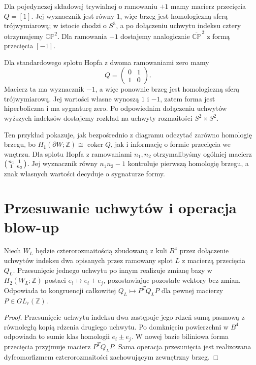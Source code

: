 \begin{przyklad}
Dla pojedynczej składowej trywialnej o ramowaniu $+1$
mamy macierz przecięcia $Q=[1]$. Jej wyznacznik jest równy $1$,
więc brzeg jest homologiczną sferą trójwymiarową; w istocie
chodzi o $S^3$, a po dołączeniu uchwytu indeksu cztery
otrzymujemy $\mathbb{CP}^2$.
Dla ramowania $-1$ dostajemy analogicznie
$\overline{\mathbb{CP}}^{\,2}$ z formą przecięcia $[-1]$.

Dla standardowego splotu Hopfa z dwoma ramowaniami zero mamy
\[
Q=\begin{pmatrix}0&1\\1&0\end{pmatrix}.
\]
Macierz ta ma wyznacznik $-1$, a więc ponownie brzeg jest
homologiczną sferą trójwymiarową. Jej wartości własne wynoszą
$1$ i $-1$, zatem forma jest hiperboliczna i ma sygnaturę zero.
Po odpowiednim dołączeniu uchwytów wyższych indeksów dostajemy
rozkład na uchwyty rozmaitości $S^2\times S^2$.

Ten przykład pokazuje, jak bezpośrednio z diagramu odczytać zarówno
homologię brzegu, bo $H_1(\partial W;\mathbb Z)\cong\operatorname{coker}Q$,
jak i informację o formie przecięcia we wnętrzu. Dla splotu Hopfa
z ramowaniami $n_1,n_2$ otrzymalibyśmy ogólniej macierz
$\begin{psmallmatrix}n_1&1\\1&n_2\end{psmallmatrix}$.
Jej wyznacznik równy $n_1n_2-1$ kontroluje pierwszą homologię brzegu,
a znak własnych wartości decyduje o sygnaturze formy.
\end{przyklad}

\section{Przesuwanie uchwytów i operacja blow-up}
\label{sec:kt-slides}

\begin{stwierdzenie}
Niech $W_L$ będzie czterorozmaitością zbudowaną z kuli
$B^4$ przez dołączenie uchwytów indeksu dwa opisanych
przez ramowany splot $L$ z macierzą przecięcia $Q_L$.
Przesunięcie jednego uchwytu po innym realizuje zmianę
bazy w $H_2(W_L;\mathbb Z)$ postaci
$e_i\mapsto e_i\pm e_j$, pozostawiając pozostałe
wektory bez zmian. Odpowiada to kongruencji całkowitej
$Q_L\mapsto P^TQ_LP$ dla pewnej macierzy
$P\in GL_r(\mathbb Z)$.
\end{stwierdzenie}

\begin{proof}
Przesunięcie uchwytu indeksu dwa zastępuje jego rdzeń
sumą pasmową z równoległą kopią rdzenia drugiego uchwytu.
Po domknięciu powierzchni w $B^4$ odpowiada to sumie
klas homologii $e_i\pm e_j$. W nowej bazie biliniowa
forma przecięcia przyjmuje macierz $P^TQ_LP$.
Sama operacja przesunięcia jest realizowana dyfeomorfizmem
czterorozmaitości zachowującym zewnętrzny brzeg.
\end{proof}

